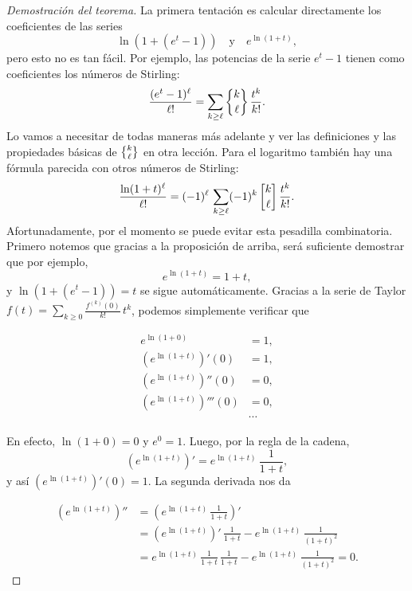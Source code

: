 \documentclass{article}
\begin{document}
\begin{proof}[Demostración del teorema]
La primera tentación es calcular directamente los coeficientes de las series
$$\ln (1 + (e^t - 1)) \quad\text{y}\quad e^{\ln (1 + t)},$$
pero esto no es tan fácil. Por ejemplo, las potencias de la serie $e^t - 1$ tienen como coeficientes los números de Stirling:
$$\frac{(e^t - 1)^\ell}{\ell!} = \sum_{k \ge \ell} \Stirling{k}{\ell}\,\frac{t^k}{k!}.$$
Lo vamos a necesitar de todas maneras más adelante y ver las definiciones y las propiedades básicas de $\Stirling{k}{\ell}$ en otra lección. Para el logaritmo también hay una fórmula parecida con otros números de Stirling:
$$\frac{\ln (1+t)^\ell}{\ell!} = (-1)^\ell \, \sum_{k \ge \ell} (-1)^k\,\stirling{k}{\ell}\,\frac{t^k}{k!}.$$
Afortunadamente, por el momento se puede evitar esta pesadilla combinatoria. Primero notemos que gracias a la proposición de arriba, será suficiente demostrar que por ejemplo,
$$e^{\ln (1+t)} = 1+t,$$
y $\ln (1 + (e^t - 1)) = t$ se sigue automáticamente. Gracias a la serie de Taylor $f (t) = \sum_{k\ge 0} \frac{f^{(k)} (0)}{k!}\,t^k$, podemos simplemente verificar que

\begin{align*}
e^{\ln (1+0)} & = 1,\\
(e^{\ln (1+t)})' (0) & = 1,\\
(e^{\ln (1+t)})'' (0) & = 0,\\
(e^{\ln (1+t)})''' (0) & = 0,\\
& \cdots
\end{align*}

En efecto, $\ln (1 + 0) = 0$ y $e^0 = 1$. Luego, por la regla de la cadena,
$$(e^{\ln (1+t)})' = e^{\ln (1+t)} \, \frac{1}{1+t},$$
y así $(e^{\ln (1+t)})' (0) = 1$. La segunda derivada nos da

\begin{align*}
(e^{\ln (1+t)})'' & = \left(e^{\ln (1+t)} \, \frac{1}{1+t}\right)' \\
 & = (e^{\ln (1+t)})'\,\frac{1}{1+t} - e^{\ln (1+t)}\,\frac{1}{(1+t)^2} \\
  & = e^{\ln (1+t)} \, \frac{1}{1+t}\, \frac{1}{1+t} - e^{\ln (1+t)}\,\frac{1}{(1+t)^2} = 0.
\end{align*}
\end{proof}
\end{document}
